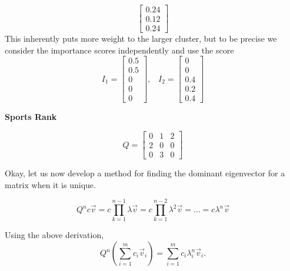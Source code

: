 \documentclass[letter]{article}
\newenvironment{menumerate}{\edef\backupindent{\the\parindent}
  \enumerate\setlength{\parindent}{\backupindent}}
  {\endenumerate}
\begin{document}
\begin{menumerate}
\begin{menumerate}
\begin{equation*}
\begin{bmatrix}
                0.24 \\
                0.12 \\
                0.24
            \end{bmatrix}
        \end{equation*}
        This inherently puts more weight to the larger cluster, but to be precise we consider the importance scores independently and use the score
        \begin{equation*}
            I_1 = \begin{bmatrix}
                0.5 \\ 0.5 \\ 0 \\ 0 \\ 0
            \end{bmatrix}, \;\;\;
            I_2 = \begin{bmatrix}
                0 \\ 0 \\ 0.4 \\ 0.2 \\0.4
            \end{bmatrix}
        \end{equation*}
	\end{menumerate}

	\newpage
    \item \textbf{Sports Rank}
    \begin{menumerate}
        \item
        \begin{equation*}
            Q = \begin{bmatrix}
                0 & 1 & 2 \\
                2 & 0 & 0 \\
                0 & 3 & 0
            \end{bmatrix}
        \end{equation*}
        \item Okay, let us now develop a method for finding the dominant eigenvector for a matrix when it is unique.
        \item
        \begin{equation*}
            Q^nc\vec{v} = c \prod_{k=1}^{n-1} \lambda \vec{v} = c \prod_{k=1}^{n-2} \lambda^2 \vec{v}= \dots = c\lambda^n \vec{v}
        \end{equation*}
        \item Using the above derivation,
        \begin{equation*}
            Q^n\left(\sum_{i=1}^m c_i \vec{v}_i\right) = \sum_{i=1}^m c_i \lambda_i^n \vec{v}_i.
        \end{equation*}


\end{menumerate}
\end{menumerate}
\end{document}
